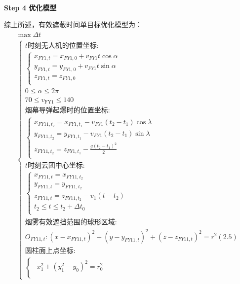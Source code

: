 \documentclass[../main.tex]{subfiles}
\begin{document}
\textbf{Step 4 优化模型}
\par 综上所述，有效遮蔽时间单目标优化模型为：
\begin{align}
  \begin{array}{c}
	\max \Delta t
  \\
\left\{ \begin{array}{l}
	t\text{时刻无人机的位置坐标:}\\
	\left\{ \begin{array}{l}
	x_{FY1,t}=x_{FY1,0}+v_{FY1}t\cos \alpha \\
	y_{FY1,t}=y_{FY1,0}+v_{FY1}t\sin \alpha \\
	z_{FY1,t}=z_{FY1,0}\\
\end{array} \right.\\
	0\leq \alpha \leq 2\pi \\
  70 \leq v_{\text{FY1}} \leq 140\\
	\text{烟幕导弹起爆时的位置坐标:}\\
	\left\{ \begin{array}{l}
	x_{FY11,t_2}=x_{FY1,t_1}-v_{FY1}\left( t_2-t_1 \right) \cos \lambda\\
	y_{FY11,t_2}=y_{FY1,t_1}-v_{FY1}\left( t_2-t_1 \right) \sin \lambda\\
	z_{FY11,t_2}=z_{FY1,t_1}-\frac{g\left( t_2-t_1 \right) ^2}{2}\\
\end{array} \right.\\
	t\text{时刻云团中心坐标:}\\
	\left\{ \begin{array}{l}
	x_{FY11,t}=x_{FY11,t_2}\\
	y_{FY11,t}=y_{FY11,t_2}\\
	z_{FY11,t}=z_{FY11,t_2}-v_1\left( t-t_2 \right)\\
	t_2\leq t\leq t_2+\Delta t_0\\
\end{array} \right.\\
	\text{烟雾有效遮挡范围的球形区域:}\\
	O_{FY11,t}:\left( x-x_{FY11,t} \right) ^2+\left( y-y_{FY11,t} \right) ^2+\left( z-z_{FY11,t} \right) ^2=r^2\left( 2.5 \right)\\
	\text{圆柱面上点坐标:}\\
	\left\{ \begin{array}{c}
	\begin{array}{l}
	x_{1}^{2}+\left( y_{1}^{2}-y_0 \right) ^2=r_{0}^{2}\\

\end{array}
\end{array}
\end{array}
\end{array}
\end{align}
\end{document}
